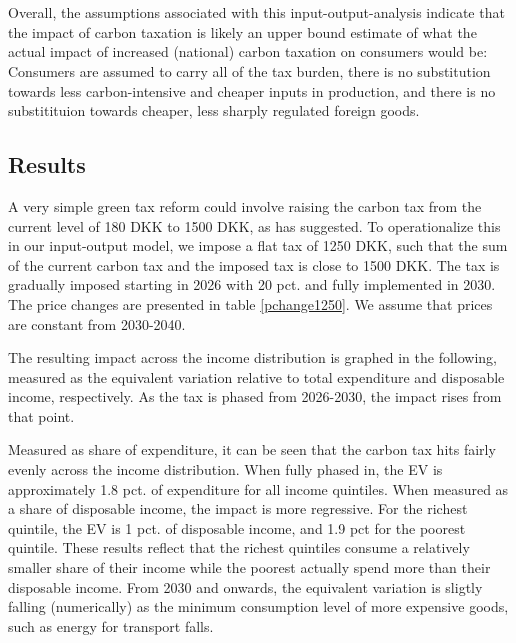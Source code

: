 \\
\\
Overall, the assumptions associated with this input-output-analysis indicate that the impact of carbon taxation is likely an upper bound estimate of what the actual impact of increased (national) carbon taxation on consumers would be: Consumers are assumed to carry all of the tax burden, there is no substitution towards less carbon-intensive and cheaper inputs in production, and there is no substitituion towards cheaper, less sharply regulated foreign goods. 



\subsection{Results}
A very simple green tax reform could involve raising the carbon tax from the current level of 180 DKK to 1500 DKK, as \cite{klimaraad2021} has suggested. To operationalize this in our input-output model, we impose a flat tax of 1250 DKK, such that the sum of the current carbon tax and the imposed tax is close to 1500 DKK. The tax is gradually imposed starting in 2026 with 20 pct. and fully implemented in 2030. The price changes are presented in table \ref{pchange1250}. We assume that prices are constant from 2030-2040.

The resulting impact across the income distribution is graphed in the following, measured as the equivalent variation relative to total expenditure and disposable income, respectively. As the tax is phased from 2026-2030, the impact rises from that point. 

Measured as share of expenditure, it can be seen that the carbon tax hits fairly evenly across the income distribution. When fully phased in, the EV is approximately 1.8 pct. of expenditure for all income quintiles. When measured as a share of disposable income, the impact is more regressive. For the richest quintile, the EV is 1 pct. of disposable income, and  1.9 pct for the poorest quintile. These results reflect that the richest quintiles consume a relatively smaller share of their income while the poorest actually spend more than their disposable income. From 2030 and onwards, the equivalent variation is sligtly falling (numerically) as the minimum consumption level of more expensive goods, such as energy for transport falls. 


